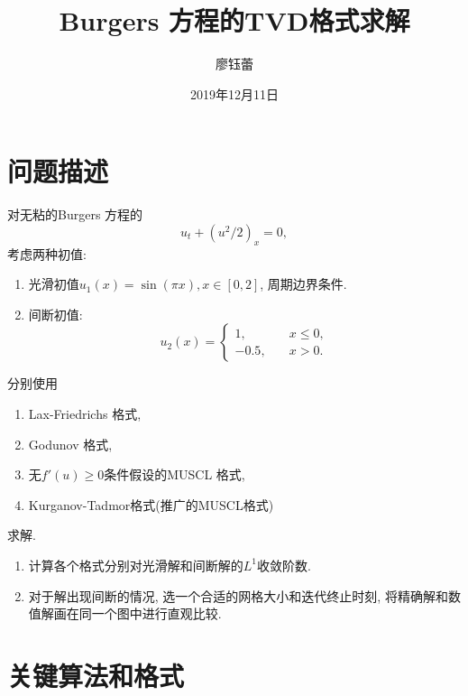 \documentclass[a4paper, 12pt]{amsart}
\numberwithin{equation}{section}
\begin{document}
\title[TVD Methods for Burgers Equations]{\Large Burgers 方程的TVD格式求解}
\author[Y.L. Liao]{廖钰蕾}
\address{数学与系统科学研究院计算数学与科学工程计算研究所\\
电子邮箱 {\tt: \url{liaoyulei19@mails.ucas.ac.cn}}
}
\date{2019年12月11日}
\maketitle

\section{\large\bf 问题描述}
对无粘的Burgers 方程的
\[u_t+(u^2/2)_x=0,\]
考虑两种初值:
\begin{enumerate}
\item 光滑初值$u_1(x)=\sin(\pi x),x\in[0,2]$, 周期边界条件.
\item 间断初值:
\[u_2(x)=\begin{cases}
1,\quad&x\le0,\\
-0.5,\quad&x>0.
\end{cases}\]
\end{enumerate}
分别使用
\begin{enumerate}
\item Lax-Friedrichs 格式,
\item Godunov 格式,
\item 无$f'(u)\ge0$条件假设的MUSCL 格式,
\item Kurganov-Tadmor格式(推广的MUSCL格式)
\end{enumerate}
求解.
\begin{enumerate}
\item 计算各个格式分别对光滑解和间断解的$L^1$收敛阶数.
\item 对于解出现间断的情况, 选一个合适的网格大小和迭代终止时刻, 将精确解和数值解画在同一个图中进行直观比较.
\end{enumerate}

\section{\large\bf 关键算法和格式}
\end{document}
